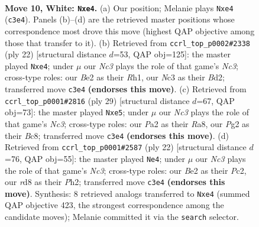 \documentclass[11pt]{article}
\begin{document}
\clearpage

\begin{figure}[p]\centering
\begin{subfigure}{0.46\textwidth}\centering
\resizebox{\linewidth}{!}{%
\newchessgame
\chessboard[
  setfen={rnbr2k1/ppp2pbp/6p1/4N3/2P1n3/2N5/PP2BPPP/R1B1K2R w KQ - 0 10},
  showmover=false,
  pgfstyle=straightmove, color=movearrow, markmove={c3-e4}
]}
\caption{}
\end{subfigure}\hfill
\begin{subfigure}{0.46\textwidth}\centering
\resizebox{\linewidth}{!}{%
\newchessgame
\chessboard[
  setfen={rn1r2k1/ppp2pb1/4b1pp/4N3/2P1n3/2N5/PP1BBPPP/R3K2R w KQ - 0 12},
  showmover=false,
  pgfstyle=straightmove, color=movearrow, markmove={c3-e4}
]}
\caption{}
\end{subfigure}
\\[4pt]
\begin{subfigure}{0.46\textwidth}\centering
\resizebox{\linewidth}{!}{%
\newchessgame
\chessboard[
  setfen={r1br2k1/pp3ppp/2n1p3/3nN3/8/2B1P3/PPR1BPPP/4K2R b K - 2 15},
  showmover=false,
  pgfstyle=straightmove, color=movearrow, markmove={c6-e5}
]}
\caption{}
\end{subfigure}\hfill
\begin{subfigure}{0.46\textwidth}\centering
\resizebox{\linewidth}{!}{%
\newchessgame
\chessboard[
  setfen={r1b1kb1r/p3pppp/2p5/3nN3/8/2N5/PPP2PPP/R1B2RK1 w kq - 2 12},
  showmover=false,
  pgfstyle=straightmove, color=movearrow, markmove={c3-e4}
]}
\caption{}
\end{subfigure}
\caption{\textbf{Move 10, White: \texttt{Nxe4}.} (a) Our position; Melanie plays \texttt{Nxe4} (\texttt{c3e4}). Panels (b)--(d) are the retrieved master positions whose correspondence most drove this move (highest QAP objective among those that transfer to it). (b) Retrieved from \texttt{ccrl\_top\_p0002\#2338} (ply 22) [structural distance $d$=53, QAP obj=125]: the master played \texttt{Nxe4}; under $\mu$ our \emph{Nc3} plays the role of that game's \emph{Nc3}; cross-type roles: our \emph{B}e2 as their \emph{R}h1, our \emph{N}c3 as their \emph{B}d2; transferred move \texttt{c3e4} \textbf{(endorses this move)}. (c) Retrieved from \texttt{ccrl\_top\_p0001\#2816} (ply 29) [structural distance $d$=67, QAP obj=73]: the master played \texttt{Nxe5}; under $\mu$ our \emph{Nc3} plays the role of that game's \emph{Nc3}; cross-type roles: our \emph{P}a2 as their \emph{R}a8, our \emph{P}g2 as their \emph{B}c8; transferred move \texttt{c3e4} \textbf{(endorses this move)}. (d) Retrieved from \texttt{ccrl\_top\_p0001\#2587} (ply 22) [structural distance $d$=76, QAP obj=55]: the master played \texttt{Ne4}; under $\mu$ our \emph{Nc3} plays the role of that game's \emph{Nc3}; cross-type roles: our \emph{B}e2 as their \emph{P}c2, our \emph{r}d8 as their \emph{P}h2; transferred move \texttt{c3e4} \textbf{(endorses this move)}. Synthesis: 8 retrieved analogs transferred to \texttt{Nxe4} (summed QAP objective 423, the strongest correspondence among the candidate moves); Melanie committed it via the \texttt{search} selector.}
\label{fig:thought-m18}
\end{figure}
\end{document}
